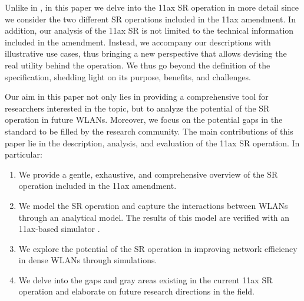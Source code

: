 \documentclass[comsoc]{IEEEtran}
\begin{document}
	Unlike in \cite{mori2014performance, qu2018survey, shen2018research}, in this paper we delve into the 11ax SR operation in more detail since we consider the two different SR operations included in the 11ax amendment. In addition, our analysis of the 11ax SR is not limited to the technical information included in the amendment. Instead, we accompany our descriptions with illustrative use cases, thus bringing a new perspective that allows devising the real utility behind the operation. We thus go beyond the definition of the specification, shedding light on its purpose, benefits, and challenges.
	
	Our aim in this paper not only lies in providing a comprehensive tool for researchers interested in the topic, but to analyze the potential of the SR operation in future WLANs. Moreover, we focus on the potential gaps in the standard to be filled by the research community. The main contributions of this paper lie in the description, analysis, and evaluation of the 11ax SR operation. In particular:
	\begin{enumerate}
		\item We provide a gentle, exhaustive, and comprehensive overview of the SR operation included in the 11ax amendment.
		\item We model the SR operation and capture the interactions between WLANs through an analytical model. The results of this model are verified with an 11ax-based simulator \cite{barrachina2019komondor}.
		\item We explore the potential of the SR operation in improving network efficiency in dense WLANs through simulations. %
		\item We delve into the gaps and gray areas existing in the current 11ax SR operation and elaborate on future research directions in the field. %
	\end{enumerate}
	
\end{document}
